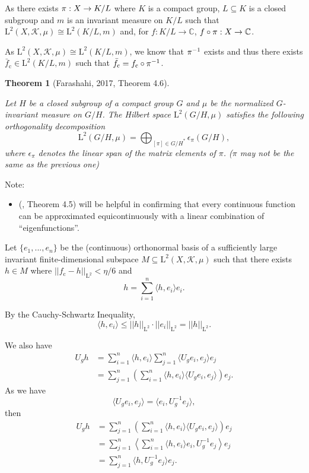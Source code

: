 \documentclass[
  british,
]{article}
\providecommand{\tightlist}{%
  \setlength{\itemsep}{0pt}\setlength{\parskip}{0pt}}
\theoremstyle{plain}
\theoremstyle{plain}
\theoremstyle{plain}
\newtheorem{theorem}{Theorem}[section]
\theoremstyle{definition}
\theoremstyle{remark}
\newcommand{\Dual}[1]{{#1}^{*}}
\newcommand{\Measure}{{\mu}}
\newcommand{\ProjectionMap}[1][\vphantom{}]{{\pi}_{#1}}
\newcommand{\SigmaAlgebra}[1]{{\mathscr{#1}}}
\begin{document}
As there exists \(\ProjectionMap:X\rightarrow K/L\) where \(K\) is a
compact group, \(L\subseteq K\) is a closed subgroup and \(m\) is an
invariant measure on \(K/L\) such that
\(\text{L}^2(X,\SigmaAlgebra{K},\Measure)\cong\text{L}^2(K/L,m)\) and,
for \(f:K/L\rightarrow\mathbb{C}\),
\(f\circ\ProjectionMap:X\rightarrow\mathbb{C}\).

As \(\text{L}^2(X,\SigmaAlgebra{K},\Measure)\cong\text{L}^2(K/L,m)\), we
know that \(\ProjectionMap^{-1}\) exists and thus there exists
\(\bar{f}_\text{c}\in\text{L}^2(K/L,m)\) such that
\(\bar{f}_\text{c}=f_\text{c}\circ\ProjectionMap^{-1}\).

\begin{theorem}[{Farashahi, 2017, Theorem
4.6}]\protect\hypertarget{thm-Peter-Weyl-decomp}{}\label{thm-Peter-Weyl-decomp}

Let \(H\) be a closed subgroup of a compact group \(G\) and \(\mu\) be
the normalized \(G\)-invariant measure on \(G/H\). The Hilbert space
\(\text{L}^2(G/H,\mu)\) satisfies the following orthogonality
decomposition \[
\text{L}^2(G/H,\mu)=\bigoplus_{[\pi]\in\Dual{G/H}}\epsilon_\pi(G/H),
\] where \(\epsilon_\pi\) denotes the linear span of the matrix elements
of \(\pi\). (\(\pi\) may not be the same as the previous one)

\end{theorem}

Note:

\begin{itemize}
\tightlist
\item
  (, Theorem 4.5)
  will be helpful in confirming that every continuous function can be
  approximated equicontinuously with a linear combination of
  ``eigenfunctions''.
\end{itemize}

Let \(\{e_1,...,e_n\}\) be the (continuous) orthonormal basis of a
sufficiently large invariant finite-dimensional subspace
\(M\subseteq\text{L}^2(X,\SigmaAlgebra{K},\Measure)\) such that there
exists \(h\in M\) where \(||f_\text{c}-h||_{\text{L}^2}<\eta/6\) and \[
h=\sum_{i=1}^n \langle h,e_i \rangle e_i.
\]

By the Cauchy-Schwartz Inequality, \[
  \langle h,e_i\rangle\leq ||h||_{\text{L}^2}\cdot||e_i||_{\text{L}^2}=||h||_{\text{L}^2}.
\]

We also have \begin{align*}
U_gh&=\sum_{i=1}^n\langle h,e_i \rangle \sum_{j=1}^n \langle U_ge_i,e_j\rangle e_j
\\&=\sum_{j=1}^n \left(\sum_{i=1}^n\langle h,e_i \rangle \langle U_ge_i,e_j\rangle\right) e_j.
\end{align*} As we have \[
\langle U_ge_i,e_j\rangle = \langle e_i,U_g^{-1}e_j\rangle,
\] then \begin{align*}
U_gh&=\sum_{j=1}^n \left(\sum_{i=1}^n\langle h,e_i \rangle \langle U_ge_i,e_j\rangle\right) e_j
\\&=\sum_{j=1}^n \left\langle \sum_{i=1}^n\langle h,e_i \rangle e_i,U_g^{-1}e_j\right\rangle e_j
\\&=\sum_{j=1}^n \langle h,U_g^{-1}e_j\rangle e_j.
\end{align*}
\end{document}
